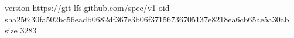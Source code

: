 version https://git-lfs.github.com/spec/v1
oid sha256:30fa502bc56eadb0682df367e3b06f37156736705137e8218ea6cb65ae5a30ab
size 3283
